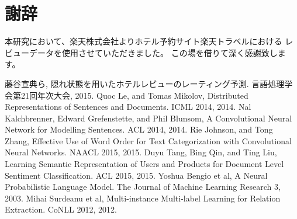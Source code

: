 \documentclass[twocolumn,a4paper]{ltjarticle}
\begin{document}
\section*{謝辞}
本研究において、楽天株式会社よりホテル予約サイト楽天トラベルにおける
レビューデータを使用させていただきました。
この場を借りて深く感謝致します。




\begin{thebibliography}{9}
  藤谷宣典ら,
  隠れ状態を用いたホテルレビューのレーティング予測.
  言語処理学会第21回年次大会, 2015.
  Quoc Le, and Tomas Mikolov,
  Distributed Representations of Sentences and Documents.
  ICML 2014, 2014.
  Nal Kalchbrenner, Edward Grefenstette, and Phil Blunsom,
  A Convolutional Neural Network for Modelling Sentences.
  ACL 2014, 2014.
  Rie Johnson, and Tong Zhang,
  Effective Use of Word Order for Text Categorization
  with Convolutional Neural Networks.
  NAACL 2015, 2015.
  Duyu Tang, Bing Qin, and Ting Liu,
  Learning Semantic Representation of Users and Products
  for Document Level Sentiment Classification.
  ACL 2015, 2015.
  Yoshua Bengio et al,
  A Neural Probabilistic Language Model.
  The Journal of Machine Learning Research 3, 2003.
  Mihai Surdeanu et al,
  Multi-instance Multi-label Learning for Relation Extraction.
  CoNLL 2012, 2012.
\end{thebibliography}
\end{document}

